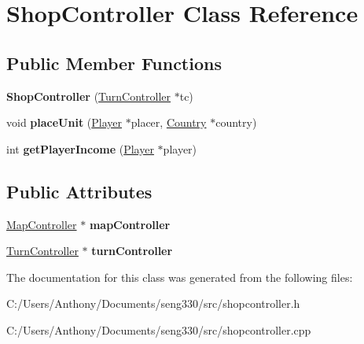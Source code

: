 \hypertarget{class_shop_controller}{}\section{Shop\+Controller Class Reference}
\label{class_shop_controller}
\subsection*{Public Member Functions}
\begin{DoxyCompactItemize}
\item 
\hypertarget{class_shop_controller_a02945177e65fca47c9cddee1a7b3fdb6}{}{\bfseries Shop\+Controller} (\hyperlink{class_turn_controller}{Turn\+Controller} $\ast$tc)\label{class_shop_controller_a02945177e65fca47c9cddee1a7b3fdb6}

\item 
\hypertarget{class_shop_controller_a6f1f54172f914d26432bee8cf2f888ed}{}void {\bfseries place\+Unit} (\hyperlink{class_player}{Player} $\ast$placer, \hyperlink{class_country}{Country} $\ast$country)\label{class_shop_controller_a6f1f54172f914d26432bee8cf2f888ed}

\item 
\hypertarget{class_shop_controller_acca2acc6d4aa2ad91db60f8461e74ad1}{}int {\bfseries get\+Player\+Income} (\hyperlink{class_player}{Player} $\ast$player)\label{class_shop_controller_acca2acc6d4aa2ad91db60f8461e74ad1}

\end{DoxyCompactItemize}
\subsection*{Public Attributes}
\begin{DoxyCompactItemize}
\item 
\hypertarget{class_shop_controller_a44304a0e1de2f28cdcce75b9ae265a83}{}\hyperlink{class_map_controller}{Map\+Controller} $\ast$ {\bfseries map\+Controller}\label{class_shop_controller_a44304a0e1de2f28cdcce75b9ae265a83}

\item 
\hypertarget{class_shop_controller_a3d14a370bf604d6f52f3a94749dd1913}{}\hyperlink{class_turn_controller}{Turn\+Controller} $\ast$ {\bfseries turn\+Controller}\label{class_shop_controller_a3d14a370bf604d6f52f3a94749dd1913}

\end{DoxyCompactItemize}


The documentation for this class was generated from the following files\+:\begin{DoxyCompactItemize}
\item 
C\+:/\+Users/\+Anthony/\+Documents/seng330/src/shopcontroller.\+h\item 
C\+:/\+Users/\+Anthony/\+Documents/seng330/src/shopcontroller.\+cpp\end{DoxyCompactItemize}
